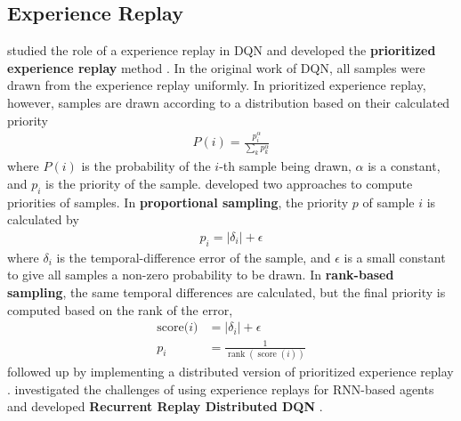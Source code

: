 \subsection{Experience Replay}
\citeauthor{PrioritizedExperienceReplay_Schaul.Quan.ea_2016} studied the role of a experience replay in DQN and developed the \textbf{prioritized experience replay} method \cite{PrioritizedExperienceReplay_Schaul.Quan.ea_2016}.
In the original work of DQN, all samples were drawn from the experience replay uniformly.
In prioritized experience replay, however, samples are drawn according to a distribution based on their calculated priority
\begin{align*}
    P(i)=\frac{p_{i}^{\alpha}}{\sum_{k} p_{k}^{\alpha}}
\end{align*}
where $P(i)$ is the probability of the $i$-th sample being drawn, $\alpha$ is a constant, and $p_i$ is the priority of the sample.
\citeauthor{PrioritizedExperienceReplay_Schaul.Quan.ea_2016} developed two approaches to compute priorities of samples.
In \textbf{proportional sampling}, the priority $p$ of sample $i$ is calculated by
\begin{align*}
    p_i = \left|\delta_{i}\right|+\epsilon
\end{align*}
where $\delta_{i}$ is the temporal-difference error of the sample, and $\epsilon$ is a small constant to give all samples a non-zero probability to be drawn.
In \textbf{rank-based sampling}, the same temporal differences are calculated, but the final priority is computed based on the rank of the error,
\begin{align*}
    \text{score($i$)}  & = \left|\delta_{i}\right|+\epsilon  \\
    p_{i}              & = \frac{1}{\operatorname{rank}(\operatorname{score}(i))}
\end{align*}
\citeauthor{DistributedPrioritizedExperience_Horgan.Quan.ea_2018} followed up by implementing a distributed version of prioritized experience replay \cite{DistributedPrioritizedExperience_Horgan.Quan.ea_2018}.
\citeauthor{RECURRENTEXPERIENCEREPLAY_Kapturowski.Ostrovski.ea_2019} investigated the challenges of using experience replays for RNN-based agents and developed \textbf{Recurrent Replay Distributed DQN} \cite{RECURRENTEXPERIENCEREPLAY_Kapturowski.Ostrovski.ea_2019}.


